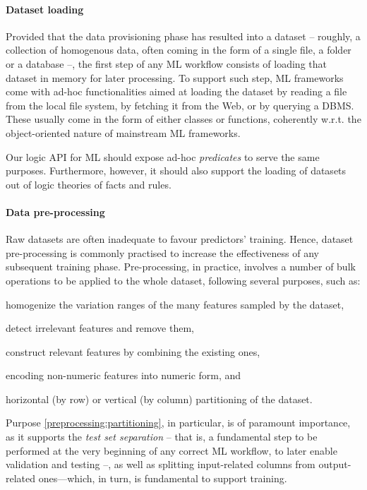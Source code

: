 \documentclass[12pt,a4paper,openright,twoside]{book}
\begin{document}
\paragraph{Dataset loading}

Provided that the data provisioning phase has resulted into a dataset -- roughly, a collection of homogenous data, often coming in the form of a single file, a folder or a database --, the first step of any ML workflow consists of loading that dataset in memory for later processing.
%
To support such step, ML frameworks come with ad-hoc functionalities aimed at loading the dataset by reading a file from the local file system, by fetching it from the Web, or by querying a DBMS.
%
These usually come in the form of either classes or functions, coherently w.r.t. the object-oriented nature of mainstream ML frameworks.

Our logic API for ML should expose ad-hoc \emph{predicates} to serve the same purposes.
%
Furthermore, however, it should also support the loading of datasets out of logic theories of facts and rules.

\paragraph{Data pre-processing}

Raw datasets are often inadequate to favour predictors' training.
%
Hence, dataset pre-processing is commonly practised to increase the effectiveness of any subsequent training phase.
%
Pre-processing, in practice, involves a number of bulk operations to be applied to the whole dataset, following several purposes, such as:
%
\begin{inlinelist}
    \item homogenize the variation ranges of the many features sampled by the dataset,
    \item detect irrelevant features and remove them,
    \item construct relevant features by combining the existing ones,
    \item encoding non-numeric features into numeric form, and
    \item\label{preprocessing:partitioning} horizontal (by row) or vertical (by column) partitioning of the dataset.
\end{inlinelist}
%
Purpose \ref{preprocessing:partitioning}, in particular, is of paramount importance, as it supports the \emph{test set separation} -- that is, a fundamental step to be performed at the very beginning of any correct ML workflow, to later enable validation and testing --, as well as splitting input-related columns from output-related ones---which, in turn, is fundamental to support training.
\end{document}
